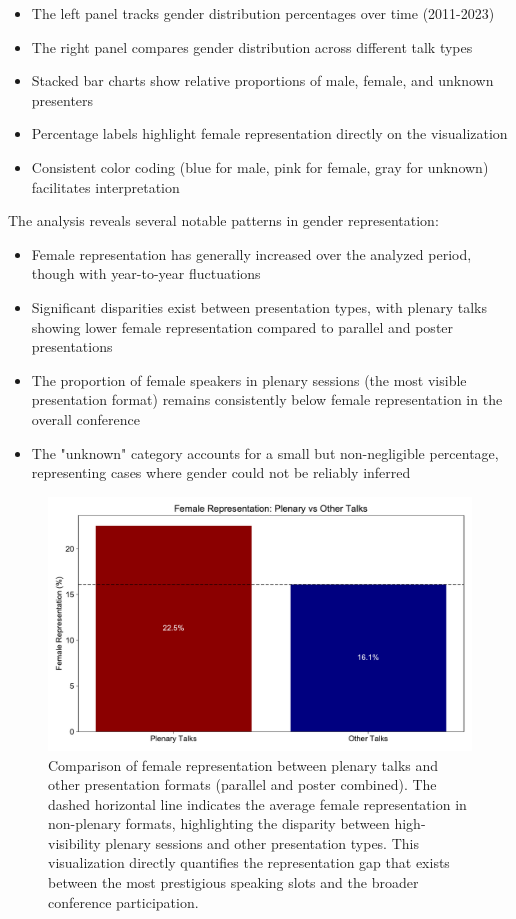 \documentclass[a4paper,11pt]{article}
\begin{document}
\begin{itemize}
    \item The left panel tracks gender distribution percentages over time (2011-2023)
    \item The right panel compares gender distribution across different talk types
    \item Stacked bar charts show relative proportions of male, female, and unknown presenters
    \item Percentage labels highlight female representation directly on the visualization
    \item Consistent color coding (blue for male, pink for female, gray for unknown) facilitates interpretation
\end{itemize}

The analysis reveals several notable patterns in gender representation:

\begin{itemize}
    \item Female representation has generally increased over the analyzed period, though with year-to-year fluctuations
    \item Significant disparities exist between presentation types, with plenary talks showing lower female representation compared to parallel and poster presentations
    \item The proportion of female speakers in plenary sessions (the most visible presentation format) remains consistently below female representation in the overall conference
    \item The "unknown" category accounts for a small but non-negligible percentage, representing cases where gender could not be reliably inferred
\end{itemize}

\begin{figure}[H]
\centering
\includegraphics[width=\textwidth]{figures/gender_representation_comparison.pdf}
\caption{Comparison of female representation between plenary talks and other presentation formats (parallel and poster combined). The dashed horizontal line indicates the average female representation in non-plenary formats, highlighting the disparity between high-visibility plenary sessions and other presentation types. This visualization directly quantifies the representation gap that exists between the most prestigious speaking slots and the broader conference participation.}
\label{fig:gender_representation_comparison}
\end{figure}
\end{document}

